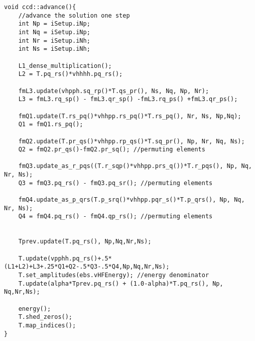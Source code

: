 \begin{verbatim}
void ccd::advance(){
    //advance the solution one step
    int Np = iSetup.iNp;
    int Nq = iSetup.iNp;
    int Nr = iSetup.iNh;
    int Ns = iSetup.iNh;

    L1_dense_multiplication();
    L2 = T.pq_rs()*vhhhh.pq_rs();
    
    fmL3.update(vhpph.sq_rp()*T.qs_pr(), Ns, Nq, Np, Nr);
    L3 = fmL3.rq_sp() - fmL3.qr_sp() -fmL3.rq_ps() +fmL3.qr_ps();

    fmQ1.update(T.rs_pq()*vhhpp.rs_pq()*T.rs_pq(), Nr, Ns, Np,Nq);
    Q1 = fmQ1.rs_pq();

    fmQ2.update(T.pr_qs()*vhhpp.rp_qs()*T.sq_pr(), Np, Nr, Nq, Ns);
    Q2 = fmQ2.pr_qs()-fmQ2.pr_sq(); //permuting elements

    fmQ3.update_as_r_pqs((T.r_sqp()*vhhpp.prs_q())*T.r_pqs(), Np, Nq, Nr, Ns);
    Q3 = fmQ3.pq_rs() - fmQ3.pq_sr(); //permuting elements

    fmQ4.update_as_p_qrs(T.p_srq()*vhhpp.pqr_s()*T.p_qrs(), Np, Nq, Nr, Ns); 
    Q4 = fmQ4.pq_rs() - fmQ4.qp_rs(); //permuting elements


    Tprev.update(T.pq_rs(), Np,Nq,Nr,Ns);

    T.update(vpphh.pq_rs()+.5*(L1+L2)+L3+.25*Q1+Q2-.5*Q3-.5*Q4,Np,Nq,Nr,Ns);
    T.set_amplitudes(ebs.vHFEnergy); //energy denominator
    T.update(alpha*Tprev.pq_rs() + (1.0-alpha)*T.pq_rs(), Np, Nq,Nr,Ns);

    energy();
    T.shed_zeros();
    T.map_indices();
}

\end{verbatim}

\FloatBarrier

